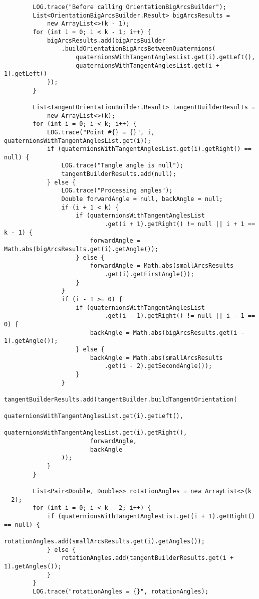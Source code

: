\begin{verbatim}
        LOG.trace("Before calling OrientationBigArcsBuilder");
        List<OrientationBigArcsBuilder.Result> bigArcsResults =
            new ArrayList<>(k - 1);
        for (int i = 0; i < k - 1; i++) {
            bigArcsResults.add(bigArcsBuilder
                .buildOrientationBigArcsBetweenQuaternions(
                    quaternionsWithTangentAnglesList.get(i).getLeft(),
                    quaternionsWithTangentAnglesList.get(i + 1).getLeft()
            ));
        }

        List<TangentOrientationBuilder.Result> tangentBuilderResults =
            new ArrayList<>(k);
        for (int i = 0; i < k; i++) {
            LOG.trace("Point #{} = {}", i, quaternionsWithTangentAnglesList.get(i));
            if (quaternionsWithTangentAnglesList.get(i).getRight() == null) {
                LOG.trace("Tangle angle is null");
                tangentBuilderResults.add(null);
            } else {
                LOG.trace("Processing angles");
                Double forwardAngle = null, backAngle = null;
                if (i + 1 < k) {
                    if (quaternionsWithTangentAnglesList
                            .get(i + 1).getRight() != null || i + 1 == k - 1) {
                        forwardAngle = Math.abs(bigArcsResults.get(i).getAngle());
                    } else {
                        forwardAngle = Math.abs(smallArcsResults
                            .get(i).getFirstAngle());
                    }
                }
                if (i - 1 >= 0) {
                    if (quaternionsWithTangentAnglesList
                            .get(i - 1).getRight() != null || i - 1 == 0) {
                        backAngle = Math.abs(bigArcsResults.get(i - 1).getAngle());
                    } else {
                        backAngle = Math.abs(smallArcsResults
                            .get(i - 2).getSecondAngle());
                    }
                }
                tangentBuilderResults.add(tangentBuilder.buildTangentOrientation(
                        quaternionsWithTangentAnglesList.get(i).getLeft(),
                        quaternionsWithTangentAnglesList.get(i).getRight(),
                        forwardAngle,
                        backAngle
                ));
            }
        }

        List<Pair<Double, Double>> rotationAngles = new ArrayList<>(k - 2);
        for (int i = 0; i < k - 2; i++) {
            if (quaternionsWithTangentAnglesList.get(i + 1).getRight() == null) {
                rotationAngles.add(smallArcsResults.get(i).getAngles());
            } else {
                rotationAngles.add(tangentBuilderResults.get(i + 1).getAngles());
            }
        }
        LOG.trace("rotationAngles = {}", rotationAngles);


\end{verbatim}
